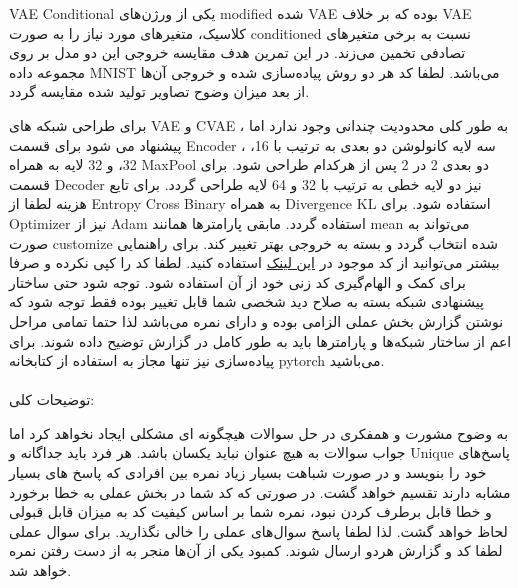 
VAE Conditional یکی از ورژن‌های modified شده VAE بوده که بر خلاف VAE کلاسیک، متغیرهای مورد نیاز را به صورت conditioned نسبت به برخی متغیرهای تصادفی تخمین می‌زند. در این تمرین هدف مقایسه خروجی این دو مدل بر روی مجموعه داده MNIST می‌باشد. لطفا کد هر دو روش پیاده‌سازی شده و خروجی آن‌ها از بعد میزان وضوح تصاویر تولید شده مقایسه گردد.

برای طراحی شبکه های VAE و CVAE ، به طور کلی محدودیت چندانی وجود ندارد اما پیشنهاد می شود برای قسمت Encoder ، سه لایه کانولوشن دو بعدی به ترتیب با 16، 32، و 32 لایه به همراه MaxPool دو بعدی 2 در 2 پس از هرکدام طراحی شود. برای قسمت Decoder نیز دو لایه خطی به ترتیب با 32 و 64 لایه طراحی گردد. برای تایع هزینه لطفا از Entropy Cross Binary به همراه Divergence KL استفاده شود. برای Optimizer نیز از Adam استفاده گردد. مابقی پارامترها همانند mean می‌تواند به صورت customize شده انتخاب گردد و بسته به خروجی بهتر تغییر کند. برای راهنمایی بیشتر می‌توانید از کد موجود در
\href{https://github.com/chendaichao/VAE-pytorch}{این لینک}
استفاده کنید. لطفا کد را کپی نکرده و صرفا برای کمک و الهام‌گیری کد زنی خود از آن استفاده شود. توجه شود حتی ساختار پیشنهادی شبکه بسته به صلاح دید شخصی شما قابل تغییر بوده فقط توجه شود که نوشتن گزارش بخش عملی الزامی بوده و دارای نمره می‌باشد لذا حتما تمامی مراحل اعم از ساختار شبکه‌ها و پارامترها باید به طور کامل در گزارش توضیح داده شوند. برای پیاده‌سازی نیز تنها مجاز به استفاده از کتابخانه pytorch می‌باشید.
\\
\\


توضیحات کلی:


به وضوح مشورت و همفکری در حل سوالات هیچگونه ای مشکلی ایجاد نخواهد کرد اما جواب سوالات به هیچ عنوان نباید یکسان باشد. هر فرد باید جداگانه و Unique پاسخ‌های خود را بنویسد و در صورت شباهت بسیار زیاد نمره بین افرادی که پاسخ های بسیار مشابه دارند تقسیم خواهد گشت.
در صورتی که کد شما در بخش عملی به خطا برخورد و خطا قابل برطرف کردن نبود، نمره شما بر اساس کیفیت کد به میزان قابل قبولی لحاظ خواهد گشت. لذا لطفا پاسخ سوال‌های عملی را خالی نگذارید.
برای سوال عملی لطفا کد و گزارش هردو ارسال شوند. کمبود یکی از آن‌ها منجر به از دست رفتن نمره خواهد شد.

